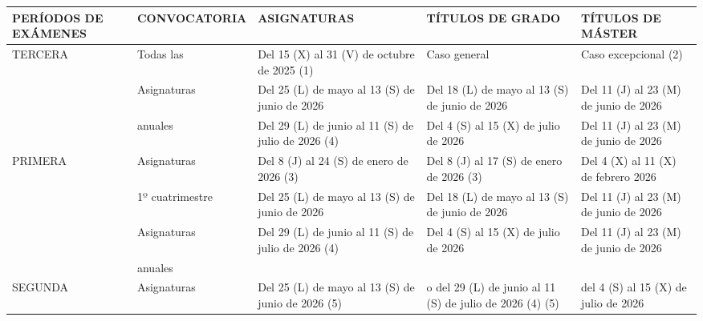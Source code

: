 \documentclass{article}
\begin{document}
\begin{itemize}
\begin{itemize}
\begin{scriptsize}
                  \vspace{0.4cm}
                  \begin{table}[h!]\centering\renewcommand{\arraystretch}{1.3}
                    \begin{tabular}{|p{}|p{}|p{}|p{}|p{}|}\hline
                      PERÍODOS DE EXÁMENES & CONVOCATORIA    & ASIGNATURAS                                        & TÍTULOS DE GRADO                                         & TÍTULOS DE MÁSTER                     \\\hline
                      TERCERA              & Todas las       & Del 15 (X) al 31 (V) de octubre de 2025 (1)        & Caso general                                             & Caso excepcional (2)                  \\\hline
                                           & Asignaturas     & Del 25 (L) de mayo al 13 (S) de junio de 2026      & Del 18 (L) de mayo al 13 (S) de junio de 2026            & Del 11 (J) al 23 (M) de junio de 2026 \\\hline
                                           & anuales         & Del 29 (L) de junio al 11 (S) de julio de 2026 (4) & Del 4 (S) al 15 (X) de julio de 2026                     & Del 11 (J) al 23 (M) de junio de 2026 \\\hline
                      PRIMERA              & Asignaturas     & Del 8 (J) al 24 (S) de enero de 2026 (3)           & Del 8 (J) al 17 (S) de enero de 2026 (3)                 & Del 4 (X) al 11 (X) de febrero 2026   \\\hline
                                           & 1º cuatrimestre & Del 25 (L) de mayo al 13 (S) de junio de 2026      & Del 18 (L) de mayo al 13 (S) de junio de 2026            & Del 11 (J) al 23 (M) de junio de 2026 \\\hline
                                           & Asignaturas     & Del 29 (L) de junio al 11 (S) de julio de 2026 (4) & Del 4 (S) al 15 (X) de julio de 2026                     & Del 11 (J) al 23 (M) de junio de 2026 \\\hline
                                           & anuales         &                                                    &                                                          &                                       \\\hline
                      SEGUNDA              & Asignaturas     & Del 25 (L) de mayo al 13 (S) de junio de 2026 (5)  & o del 29 (L) de junio al 11 (S) de julio de 2026 (4) (5) & del 4 (S) al 15 (X) de julio de 2026  \\\hline

\end{tabular}
\end{table}
\end{scriptsize}
\end{itemize}
\end{itemize}
\end{document}
